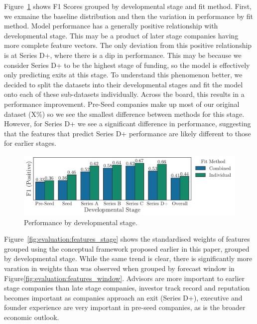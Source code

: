 ﻿\documentclass[../thesis/thesis.tex]{subfiles}
\begin{document}
Figure~\ref{fig:evaluation:performance_stage} shows F1 Scores grouped by developmental stage and fit method. First, we exmaine the baseline distribution and then the variation in performance by fit method. Model performance has a generally positive relationship with developmental stage. This may be a product of later stage companies having more complete feature vectors. The only deviation from this positive relationship is at Series D+, where there is a dip in performance. This may be because we consider Series D+ to be the highest stage of funding, so the model is effectively only predicting exits at this stage. To understand this phenomenon better, we decided to split the datasets into their developmental stages and fit the model onto each of these sub-datasets individually. Across the board, this results in a performance improvement. Pre-Seed companies make up most of our original dataset (X\%) so we see the smallest difference between methods for this stage. However, for Series D+ we see a significant difference in performance, suggesting that the features that predict Series D+ performance are likely different to those for earlier stages.

\begin{figure}[!htb]
    \centering
    \includegraphics[width=\textwidth]{../figures/evaluation/performance_stage}
    \caption[Performance by developmental stage]{Performance by developmental stage.}
    \label{fig:evaluation:performance_stage}
\end{figure}

Figure~\ref{fig:evaluation:features_stage} shows the standardised weights of features grouped using the conceptual framework proposed earlier in this paper, grouped by developmental stage. While the same trend is clear, there is significantly more varation in weights than was observed when grouped by forecast window in Figure\ref{fig:evaluation:features_window}. Advisors are more important to earlier stage companies than late stage companies, investor track record and reputation becomes important as companies approach an exit (Series D+), executive and founder experience are very important in pre-seed companies, as is the broader economic outlook.
\end{document}
